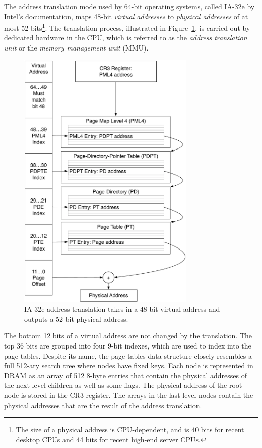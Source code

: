 
The address translation mode used by 64-bit operating systems, called
IA-32e by Intel's documentation, maps 48-bit \textit{virtual addresses} to
\textit{physical addresses} of at most 52 bits\footnote{The size of a
physical address is CPU-dependent, and is 40 bits for recent desktop CPUs and
44 bits for recent high-end server CPUs.}. The translation process, illustrated
in Figure~\ref{fig:os_paging}, is carried out by dedicated hardware in the CPU,
which is referred to as the \textit{address translation unit} or the
\textit{memory management unit} (MMU).

\begin{figure}[hbt]
  \centering
  \includegraphics[width=85mm]{figures/os_paging.pdf}
  \caption{
    IA-32e address translation takes in a 48-bit virtual address and outputs
    a 52-bit physical address.
  }
  \label{fig:os_paging}
\end{figure}

The bottom 12 bits of a virtual address are not changed by the translation. The
top 36 bits are grouped into four 9-bit indexes, which are used to index into
the page tables. Despite its name, the page tables data structure closely
resembles a full 512-ary search tree where nodes have fixed keys. Each
node is represented in DRAM as an array of 512 8-byte entries that contain the
physical addresses of the next-level children as well as some flags. The
physical address of the root node is stored in the CR3 register. The arrays in
the last-level nodes contain the physical addresses that are the result of the
address translation.


